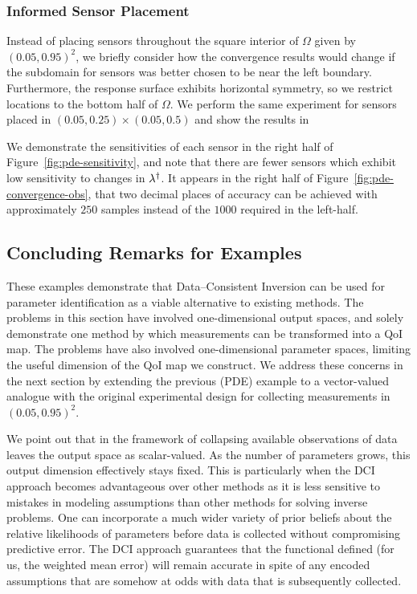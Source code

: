 \subsubsection{Informed Sensor Placement}
Instead of placing sensors throughout the square interior of $\Omega$ given by $(0.05, 0.95)^2$, we briefly consider how the convergence results would change if the subdomain for sensors was better chosen to be near the left boundary.
Furthermore, the response surface exhibits horizontal symmetry, so we restrict locations to the bottom half of $\Omega$.
We perform the same experiment for sensors placed in $(0.05, 0.25)\times(0.05, 0.5)$ and show the results in

We demonstrate the sensitivities of each sensor in the right half of Figure~\ref{fig:pde-sensitivity}, and note that there are fewer sensors which exhibit low sensitivity to changes in $\lambda^\dagger$.
It appears in the right half of Figure~\ref{fig:pde-convergence-obs}, that two decimal places of accuracy can be achieved with approximately $250$ samples instead of the $1000$ required in the left-half.


\subsection{Concluding Remarks for Examples}

These examples demonstrate that Data--Consistent Inversion can be used for parameter identification as a viable alternative to existing methods.
The problems in this section have involved one-dimensional output spaces, and solely demonstrate one method by which measurements can be transformed into a QoI map.
The problems have also involved one-dimensional parameter spaces, limiting the useful dimension of the QoI map we construct.
We address these concerns in the next section by extending the previous (PDE) example to a vector-valued analogue with the original experimental design for collecting measurements in $(0.05, 0.95)^2$.

We point out that in the framework of collapsing available observations of data leaves the output space as scalar-valued.
As the number of parameters grows, this output dimension effectively stays fixed.
This is particularly when the DCI approach becomes advantageous over other methods as it is less sensitive to mistakes in modeling assumptions than other methods for solving inverse problems.
One can incorporate a much wider variety of prior beliefs about the relative likelihoods of parameters before data is collected without compromising predictive error.
The DCI approach guarantees that the functional defined (for us, the weighted mean error) will remain accurate in spite of any encoded assumptions that are somehow at odds with data that is subsequently collected.
